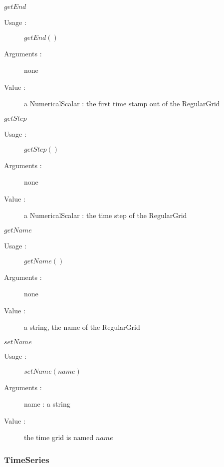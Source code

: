 \begin{description}
\begin{description}
  \item $getEnd$
    \begin{description}
    \item[Usage :] $getEnd()$
    \item[Arguments :] none
    \item[Value :] a NumericalScalar : the first time stamp out of the RegularGrid
    \end{description}
    \bigskip

  \item $getStep$
    \begin{description}
    \item[Usage :] $getStep()$
    \item[Arguments :] none
    \item[Value :] a NumericalScalar : the time step of the RegularGrid
    \end{description}
    \bigskip

  \item $getName$
    \begin{description}
    \item[Usage :] $getName()$
    \item[Arguments :] none
    \item[Value :] a string, the name of the RegularGrid
    \end{description}
    \bigskip

  \item $setName$
    \begin{description}
    \item[Usage :] $setName(name)$
    \item[Arguments :] name : a string
    \item[Value :] the time grid is named $name$
    \end{description}
    \bigskip

  \end{description}

\end{description}

\newpage \subsubsection{TimeSeries}

